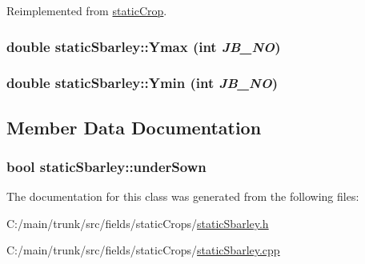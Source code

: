 Reimplemented from \hyperlink{classstatic_crop_ab7763e4e6a0b9eff1788cb86ebad8170}{staticCrop}.\hypertarget{classstatic_sbarley_a9b64302a29ec8eb3eed5d12754fee531}{
\subsubsection[{Ymax}]{\setlength{\rightskip}{0pt plus 5cm}double staticSbarley::Ymax (int {\em JB\_\-NO})}}
\label{classstatic_sbarley_a9b64302a29ec8eb3eed5d12754fee531}
\hypertarget{classstatic_sbarley_acf728af22466b5ba9d3892ba8de07a06}{
\subsubsection[{Ymin}]{\setlength{\rightskip}{0pt plus 5cm}double staticSbarley::Ymin (int {\em JB\_\-NO})}}
\label{classstatic_sbarley_acf728af22466b5ba9d3892ba8de07a06}


\subsection{Member Data Documentation}
\hypertarget{classstatic_sbarley_a597a09bd47e47f7fad390ba49185356e}{
\subsubsection[{underSown}]{\setlength{\rightskip}{0pt plus 5cm}bool {\bf staticSbarley::underSown}}}
\label{classstatic_sbarley_a597a09bd47e47f7fad390ba49185356e}


The documentation for this class was generated from the following files:\begin{DoxyCompactItemize}
\item 
C:/main/trunk/src/fields/staticCrops/\hyperlink{static_sbarley_8h}{staticSbarley.h}\item 
C:/main/trunk/src/fields/staticCrops/\hyperlink{static_sbarley_8cpp}{staticSbarley.cpp}\end{DoxyCompactItemize}
